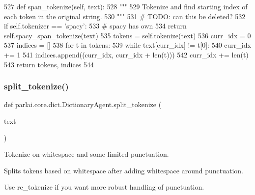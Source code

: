 \begin{DoxyCode}
527     \textcolor{keyword}{def }span\_tokenize(self, text):
528         \textcolor{stringliteral}{"""}
529 \textcolor{stringliteral}{        Tokenize and find  starting index of each token in the original string.}
530 \textcolor{stringliteral}{        """}
531         \textcolor{comment}{# TODO: can this be deleted?}
532         \textcolor{keywordflow}{if} self.tokenizer == \textcolor{stringliteral}{'spacy'}:
533             \textcolor{comment}{# spacy has own}
534             \textcolor{keywordflow}{return} self.spacy\_span\_tokenize(text)
535         tokens = self.tokenize(text)
536         curr\_idx = 0
537         indices = []
538         \textcolor{keywordflow}{for} t \textcolor{keywordflow}{in} tokens:
539             \textcolor{keywordflow}{while} text[curr\_idx] != t[0]:
540                 curr\_idx += 1
541             indices.append((curr\_idx, curr\_idx + len(t)))
542             curr\_idx += len(t)
543         \textcolor{keywordflow}{return} tokens, indices
544 
\end{DoxyCode}
\mbox{\label{classparlai_1_1core_1_1dict_1_1DictionaryAgent_a826ba5c6ff36c8ddf5d7723c50e5616d}} 
\subsubsection{\texorpdfstring{split\+\_\+tokenize()}{split\_tokenize()}}
{\footnotesize\ttfamily def parlai.\+core.\+dict.\+Dictionary\+Agent.\+split\+\_\+tokenize (\begin{DoxyParamCaption}\item[{}]{text }\end{DoxyParamCaption})\hspace{0.3cm}{\ttfamily [static]}}

\begin{DoxyVerb}Tokenize on whitespace and some limited punctuation.

Splits tokens based on whitespace after adding whitespace around
punctuation.

Use re_tokenize if you want more robust handling of punctuation.
\end{DoxyVerb}
 

